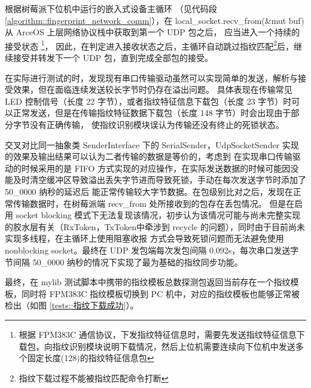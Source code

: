     根据树莓派下位机中运行的嵌入式设备主循环 （见代码段 \ref{algorithm::fingerprint_network_comm}），在 local\_socket.recv\_from(\&mut buf) 从 ArceOS 上层网络协议栈中获取到第一个 UDP 包之后，
    应当进入一个持续的接受状态
    \footnote{根据 FPM383C 通信协议，下发指纹特征信息时，需要先发送指纹特征信息下载包，向指纹识别模块说明下载情况，然后上位机需要连续向下位机中发送多个固定长度(128)的指纹特征信息包}，
    因此，在判定进入接收状态之后，主循环自动跳过指纹匹配\footnote{指纹下载过程不能被指纹匹配命令打断}后，继续接受并转发下一个 UDP 包，直到完成全部包的接受。

    在实际进行测试的时，发现现有串口传输驱动虽然可以实现简单的发送，解析与接受效果，但在面临连续发送较长字节时仍存在溢出问题。
    具体表现在传输常见 LED 控制信号（长度 22 字节），或者指纹特征信息下载包（长度 23 字节）时可以正常发送，但是在传输指纹特征数据下载包（长度 148 字节）时会出现由于部分字节没有正确传输，
    使指纹识别模块误认为传输还没有终止的死锁状态。
    
    交叉对比同一抽象类 SenderInterface 下的 SerialSender，UdpSocketSender 实现的效果及输出结果可以认为二者传输的数据是等价的，考虑到
    在实现串口传输驱动的时候采用的是 FIFO 方式实现的对应操作，在实际发送数据的时候可能因没能及时清空缓冲区导致溢出丢失字节进而导致死锁，手动在每次发送字节时添加了 50\_0000 纳秒的延迟后
    能正常传输较大字节数据。在包级别比对之后，发现在正常传输数据时，在树莓派端 recv\_from 处所接收到的包存在丢包情况。
    但是在启用 socket blocking 模式下无法复现该情况，初步认为该情况可能与尚未完整实现的胶水层有关（RxToken，TxToken中牵涉到 recycle 的问题），同时由于目前尚未实现多线程，在主循环上使用阻塞收报
    方式会导致死锁问题而无法避免使用 nonblocking socket。最终在 UDP 发包端每次发包间隔 0.092s，每次串口发送字节间隔 50\_0000 纳秒的情况下实现了最为基础的指纹同步功能。

    最终，在 mylib 测试脚本中携带的指纹模板总数探测包返回当前存在一个指纹模板，同时将 FPM383C 指纹模板切换到 PC 机中，对应的指纹模板也能够正常被检出（如图 \ref{tests::指纹下载成功}）。
    


